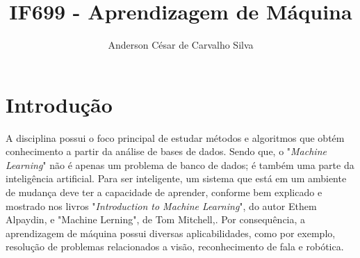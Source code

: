 \documentclass[a4paper]{article}
\title{IF699 - Aprendizagem de Máquina}
\author{Anderson César de Carvalho Silva}
\begin{document}
\maketitle

\section{Introdução}

A disciplina possui o foco principal de estudar métodos e algoritmos que obtém conhecimento a partir da análise de bases de dados. Sendo que, o "\textit{Machine Learning}" não é apenas um problema de banco de dados; é também uma parte da inteligência artificial. Para ser inteligente, um sistema que está em um ambiente de mudança deve ter a capacidade de aprender, conforme bem explicado e mostrado nos livros "\textit{Introduction to Machine Learning}", do autor Ethem Alpaydin,\cite{book:alpaydin} e "Machine Lerning", de Tom Mitchell,\cite{book:mitchell}. Por consequência, a aprendizagem de máquina possui diversas aplicabilidades, como por exemplo, resolução de problemas relacionados a visão, reconhecimento de fala e robótica.
\end{document}
